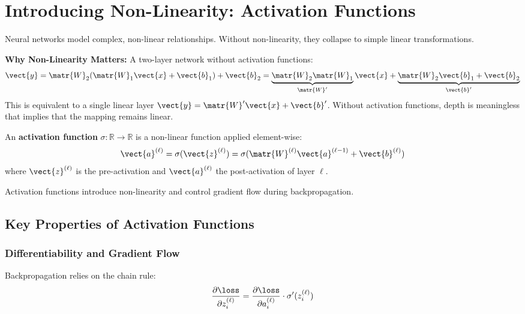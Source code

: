 \section{Introducing Non-Linearity: Activation Functions}
	
Neural networks model complex, non-linear relationships. Without non-linearity, they collapse to simple linear transformations.

\begin{abstractbox}
\textbf{Why Non-Linearity Matters:} A two-layer network without activation functions:
\begin{equation}
\vect{y} = \matr{W}_2(\matr{W}_1\vect{x} + \vect{b}_1) + \vect{b}_2 = \underbrace{\matr{W}_2\matr{W}_1}_{\matr{W}'}\vect{x} + \underbrace{\matr{W}_2\vect{b}_1 + \vect{b}_2}_{\vect{b}'}
\end{equation}
This is equivalent to a single linear layer $\vect{y} = \matr{W}'\vect{x} + \vect{b}'$. Without activation functions, depth is meaningless that implies that the mapping remains linear.
\end{abstractbox}

\begin{definition}
An \textbf{activation function} $\sigma: \mathbb{R} \to \mathbb{R}$ is a non-linear function applied element-wise:
\begin{equation}
\vect{a}^{(\ell)} = \sigma(\vect{z}^{(\ell)}) = \sigma(\matr{W}^{(\ell)}\vect{a}^{(\ell-1)} + \vect{b}^{(\ell)})
\end{equation}
where $\vect{z}^{(\ell)}$ is the pre-activation and $\vect{a}^{(\ell)}$ the post-activation of layer $\ell$.
\end{definition}

Activation functions introduce non-linearity and control gradient flow during backpropagation.

\subsection{Key Properties of Activation Functions}

\subsubsection{Differentiability and Gradient Flow}

Backpropagation relies on the chain rule:
\begin{equation}
\frac{\partial \loss}{\partial z_i^{(\ell)}} = \frac{\partial \loss}{\partial a_i^{(\ell)}} \cdot \sigma'(z_i^{(\ell)})
\end{equation}

